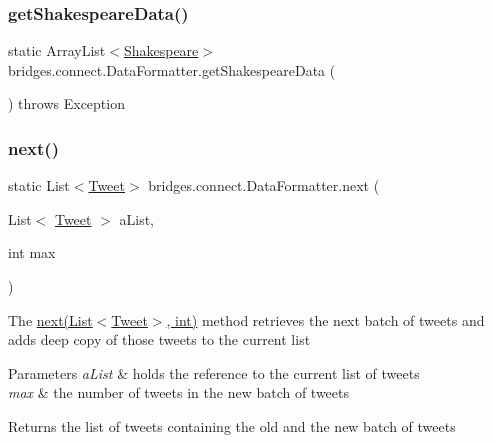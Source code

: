 \hypertarget{classbridges_1_1connect_1_1_data_formatter_abc1db0f1a9758b5fa97c167cb8fe4052}{}\label{classbridges_1_1connect_1_1_data_formatter_abc1db0f1a9758b5fa97c167cb8fe4052} 
\subsubsection{\texorpdfstring{get\+Shakespeare\+Data()}{getShakespeareData()}}
{\footnotesize\ttfamily static Array\+List$<$\hyperlink{classbridges_1_1data__src__dependent_1_1_shakespeare}{Shakespeare}$>$ bridges.\+connect.\+Data\+Formatter.\+get\+Shakespeare\+Data (\begin{DoxyParamCaption}{ }\end{DoxyParamCaption}) throws Exception\hspace{0.3cm}{\ttfamily [static]}}

\hypertarget{classbridges_1_1connect_1_1_data_formatter_a3d0b2d2e0384d2a537bb61fbeb3d00a4}{}\label{classbridges_1_1connect_1_1_data_formatter_a3d0b2d2e0384d2a537bb61fbeb3d00a4} 
\subsubsection{\texorpdfstring{next()}{next()}\hspace{0.1cm}{\footnotesize\ttfamily [1/2]}}
{\footnotesize\ttfamily static List$<$\hyperlink{classbridges_1_1data__src__dependent_1_1_tweet}{Tweet}$>$ bridges.\+connect.\+Data\+Formatter.\+next (\begin{DoxyParamCaption}\item[{List$<$ \hyperlink{classbridges_1_1data__src__dependent_1_1_tweet}{Tweet} $>$}]{a\+List,  }\item[{int}]{max }\end{DoxyParamCaption})\hspace{0.3cm}{\ttfamily [static]}}

The \hyperlink{classbridges_1_1connect_1_1_data_formatter_a3d0b2d2e0384d2a537bb61fbeb3d00a4}{next(\+List$<$\+Tweet$>$, int)} method retrieves the next batch of tweets and adds deep copy of those tweets to the current list 
\begin{DoxyParams}{Parameters}
{\em a\+List} & holds the reference to the current list of tweets \\
\hline
{\em max} & the number of tweets in the new batch of tweets \\
\hline
\end{DoxyParams}
\begin{DoxyReturn}{Returns}
the list of tweets containing the old and the new batch of tweets 
\end{DoxyReturn}

